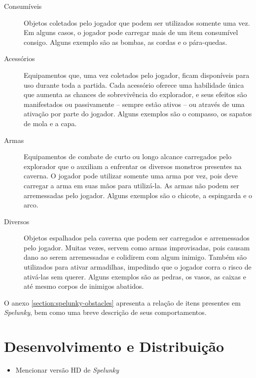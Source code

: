 \begin{description}
	\item[Consumíveis]
	Objetos coletados pelo jogador que podem ser utilizados somente uma vez. Em
	alguns casos, o jogador pode carregar mais de um item consumível consigo.
	Alguns exemplo são as bombas, as cordas e o pára-quedas.

	\item[Acessórios]
	Equipamentos que, uma vez coletados pelo jogador, ficam disponíveis para uso
	durante toda a partida. Cada acessório oferece uma habilidade única que
	aumenta as chances de sobrevivência do explorador, e seus efeitos são
	manifestados ou passivamente -- sempre estão ativos -- ou através de uma
	ativação por parte do jogador. Alguns exemplos são o compasso, os sapatos de
	mola e a capa.

	\item[Armas]
	Equipamentos de combate de curto ou longo alcance carregados pelo explorador
	que o auxiliam a enfrentar os diversos monstros presentes na caverna. O
	jogador pode utilizar somente uma arma por vez, pois deve carregar a arma em
	suas mãos para utilizá-la. As armas não podem ser arremessadas pelo jogador.
	Alguns exemplos são o chicote, a espingarda e o arco.

	\item[Diversos]
	Objetos espalhados pela caverna que podem ser carregados e arremessados pelo
	jogador. Muitas vezes, servem como armas improvisadas, pois causam dano ao
	serem arremessadas e colidirem com algum inimigo. Também são utilizados para
	ativar armadilhas, impedindo que o jogador corra o risco de ativá-las sem
	querer. Alguns exemplos são as pedras, os vasos, as caixas e até mesmo
	corpos de inimigos abatidos. 
\end{description}

O anexo \ref{section:spelunky-obstacles} apresenta a relação de itens presentes
em \textit{Spelunky}, bem como uma breve descrição de seus comportamentos.


\section{\label{section:spelunky-dev}Desenvolvimento e Distribuição}

\begin{mdframed}[backgroundcolor=green!20]
\begin{itemize}
    \item
		Mencionar versão HD de \textit{Spelunky}
\end{itemize}
\end{mdframed}

